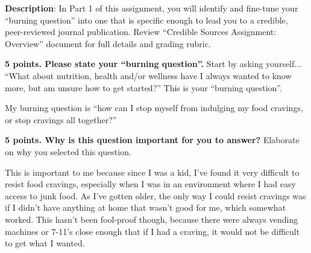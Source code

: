 \documentclass[title={Credible Sources - Formulate Question},points={20}]{fdsn201homework}
\begin{document}
\maketitle

\noindent%
\textbf{Description}: In Part 1 of this assignment, you will identify and fine-tune your ``burning question'' into one that is specific enough to lead you to a credible, peer-reviewed journal publication.
Review ``Credible Sources Assignment: Overview'' document for full details and grading rubric.

\begin{problems}
	\item \textbf{5 points. Please state your ``burning question''.}
	Start by asking yourself$\dots$ ``What about nutrition, health and/or wellness have I always wanted to know more, but am unsure how to get started?''
	This is your ``burning question''.
	\begin{answer}
		My burning question is ``how can I stop myself from indulging my food cravings, or stop cravings all together?''
	\end{answer}
	\item \textbf{5 points. Why is this question important for you to answer?}
	Elaborate on why you selected this question.
	\begin{answer}
		This is important to me because since I was a kid, I've found it very difficult to resist food cravings, especially when I was in an environment where I had easy access to junk food.
		As I've gotten older, the only way I could resist cravings was if I didn't have anything at home that wasn't good for me, which somewhat worked.
		This hasn't been fool-proof though, because there were always vending machines or 7-11's close enough that if I had a craving, it would not be difficult to get what I wanted.


\end{answer}
\end{problems}
\end{document}
